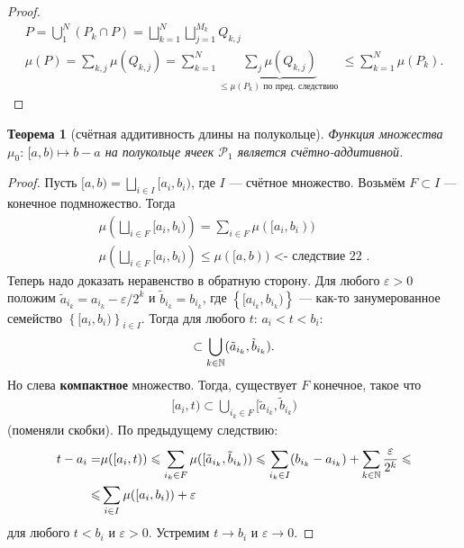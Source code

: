 \documentclass[a4paper,12pt]{article}
\newcounter{theoremCnt}
\theoremstyle{definition}
\theoremstyle{plain}
\newtheorem{thm}[theoremCnt]{Теорема}
\theoremstyle{plain}
\theoremstyle{plain}
\theoremstyle{plain}
\theoremstyle{definition}
\theoremstyle{definition}
\theoremstyle{definition}
\theoremstyle{definition}
\theoremstyle{definition}
\theoremstyle{definition}
\theoremstyle{plain}
\theoremstyle{plain}
\theoremstyle{plain}
\theoremstyle{plain}
\theoremstyle{definition}
\theoremstyle{definition}
\theoremstyle{definition}
\theoremstyle{definition}
\theoremstyle{definition}
\newcommand{\N}{\ensuremath \mathbb{N}}
\begin{document}
\begin{proof}
 \begin{align*}
  P = \bigcup_1^N (P_k \cap P) = \bigsqcup_{k=1}^N \bigsqcup_{j=1}^{M_k} Q_{k,j} \\
  \mu(P) = \sum_{k,j}^{} \mu(Q_{k,j}) = \sum_{k=1}^{N} \underbrace{\sum_j \mu(Q_{k,j})}_{\leqslant \mu(P_k) \text{ по пред. следствию }} \leqslant \sum_{k=1}^{N} \mu(P_k)
 .\end{align*}
\end{proof}
\begin{thm}[счётная аддитивность длины на полукольце]
 Функция множества $ \mu_0 \colon\, [a, b) \mapsto b - a $ на полукольце ячеек $ \mathcal{P}_1 $ является счётно-аддитивной.
\end{thm}
\begin{proof}
 Пусть $ [a, b) = \bigsqcup_{i \in I} [a_i, b_i) $, где $ I $ --- счётное множество. Возьмём $ F \subset I $ --- конечное подмножество. Тогда
 \begin{align*}
  \mu\left( \bigsqcup_{i \in F} [a_i, b_i) \right) = \sum_{i \in F}^{} \mu( [a_i, b_i) ) \\
  \mu\left( \bigsqcup_{i \in F} [a_i, b_i) \right) \leqslant \mu([a, b)) \text { <- следствие 22 }
 .\end{align*} Теперь надо доказать неравенство в обратную сторону. Для любого $ \varepsilon > 0 $ положим $ \tilde a_{i_k} = a_{i_k} - \varepsilon/2^k $ и $ \tilde b_{i_k} = b_{i_k} $, где $ \left\{ [a_{i_k}, b_{i_k}) \right\}  $ --- как-то занумерованное семейство $ \left\{ [a_i, b_i) \right\}_{i \in I}  $. Тогда для любого $ t $: $ a_i < t < b_i $:
 \begin{align*}
  [a_i, t] \subset \bigcup_{k \in \N} (\tilde a_{i_k}, \tilde b_{i_k})
 .\end{align*} Но слева \textbf{компактное} множество. Тогда, существует $ F $ конечное, такое что
 \begin{align*}
  [a_i, t) \subset \bigcup_{i_k \in F} [\tilde a_{i_k}, \tilde b_{i_k})
 \end{align*} (поменяли скобки). По предыдущему следствию:
 \begin{align*}
  t - a_i = &\mu([a_i, t)) \leqslant \sum_{i_k \in F}^{} \mu([\tilde a_{i_k}, \tilde b_{i_k})) \leqslant \sum_{i_k \in I}^{} (b_{i_k} - a_{i_k}) + \sum_{k \in \N} \frac{\varepsilon}{2^k} \leqslant \\
  \leqslant &\sum_{i \in I} \mu([a_i, b_i)) + \varepsilon
 \end{align*} для любого $ t < b_i $ и $ \varepsilon > 0 $. Устремим $ t \to b_i $ и $ \varepsilon \to 0 $.
\end{proof}
\end{document}
